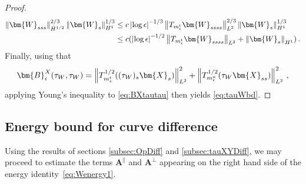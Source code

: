 \documentclass[11pt,reqno]{amsart}
\newcommand{\X}{\bm{X}}
\newcommand{\abs}[1]{\left\lvert #1 \right\rvert}
\newcommand{\norm}[1]{\left\lVert #1 \right\rVert}
\numberwithin{equation}{section}
\theoremstyle{definition}
\begin{document}
\begin{proof}
\begin{equation}
\begin{aligned}
  \norm{\bm{W}_{sss}}_{\dot H^{1/2}}^{2/3}\norm{\bm{W}_s}_{H^1}^{1/3}&\le c\abs{\log\epsilon}^{-1/3}\norm{T_{m_\epsilon^{\rm t}}\bm{W}_{ssss}}_{L^2}^{2/3}\norm{\bm{W}_s}_{H^1}^{1/3}\\
  &\le c(\abs{\log\epsilon}^{-1/2}\norm{T_{m_\epsilon^{\rm t}}\bm{W}_{ssss}}_{L^2} + \norm{\bm{W}_s}_{H^1})\,.
\end{aligned}
\end{equation} 
%
%
Finally, using that 
\begin{equation}
  \bm{B}_\epsilon^X(\tau_W,\tau_W) = \norm{T_{m_\epsilon^{\rm t}}^{1/2}((\tau_W)_s\X_s)}_{L^2}^2 + 
  \norm{T_{m_\epsilon^{\rm n}}^{1/2}(\tau_W\X_{ss})}_{L^2}^2\,,
\end{equation}
applying Young's inequality to \eqref{eq:BXtautau} then yields \eqref{eq:tauWbd}.
%
%
\end{proof}




\subsection{Energy bound for curve difference}
Using the results of sections \ref{subsec:OpDiff} and \ref{subsec:tauXYDiff}, we may proceed to estimate the terms $\bm{A}^\parallel$ and $\bm{A}^\perp$ appearing on the right hand side of the energy identity~\eqref{eq:Wenergy1}. 
\end{document}
